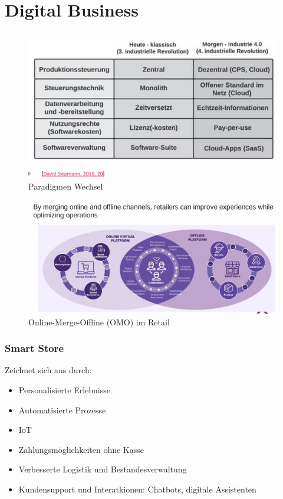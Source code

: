\documentclass[../Main.tex]{subfiles}
\begin{document}
\chapter{Digital Business}

\intro{

}

\begin{figure}[H]
    \centering
    \includegraphics[width=1\linewidth]{Images/digbus/paradigmen-wechsel.png}
    \caption{Paradigmen Wechsel}
\end{figure}

\begin{figure}[H]
    \centering
    \includegraphics[width=1\linewidth]{Images/digbus/omo.png}
    \caption{Online-Merge-Offline (OMO) im Retail}
\end{figure}

\subsection{Smart Store}
Zeichnet sich aus durch:
\begin{itemize}
    \item Personalisierte Erlebnisse 
    \item Automatisierte Prozesse
    \item IoT
    \item Zahlungsmöglichkeiten ohne Kasse
    \item Verbesserte Logistik und Bestandesverwaltung
    \item Kundensupport und Interatkionen: Chatbots, digitale Assistenten
\end{itemize}
\end{document}
